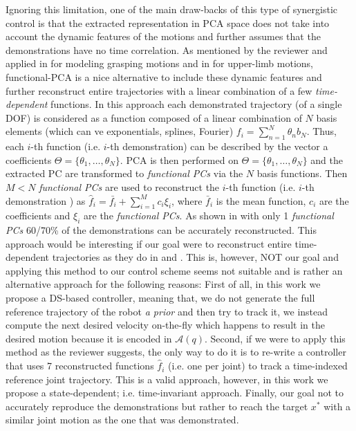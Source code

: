 \documentclass{article}
\begin{document}
\begin{enumerate}
Ignoring this limitation, one of the main draw-backs of this type of synergistic control is that the extracted representation in PCA space does not take into account the dynamic features of the motions and further assumes that the demonstrations have no time correlation. As mentioned by the reviewer and applied in \cite{Dai:IROS:2013} for modeling grasping motions and in \cite{Averta:FRAI:2017} for upper-limb motions, functional-PCA is a nice alternative to include these dynamic features and further reconstruct entire trajectories with a linear combination of a few \textit{time-dependent} functions. In this approach each demonstrated trajectory (of a single DOF) is considered as a function composed of a linear combination of $N$ basis elements (which can ve exponentials, splines, Fourier) $f_i = \sum\limits_{n=1}^{N}\theta_nb_N$. Thus, each $i$-th function (i.e. $i$-th demonstration) can be described by the vector a coefficients $\Theta = \{\theta_1,\dots,\theta_N\}$. PCA is then performed on $\Theta = \{\theta_1,\dots,\theta_N\}$ and the extracted PC are transformed to \textit{functional PCs} via the $N$ basis functions. Then $M<N$ \textit{functional PCs} are used to reconstruct the $i$-th function (i.e. $i$-th demonstration ) as $\hat{f}_i = \bar{f_i} + \sum\limits_{i=1}^{M}c_i\xi_i$, where $\bar{f}_i$ is the mean function, $c_i$ are the coefficients and $\xi_i$ are the \textit{functional PCs}. As shown in \cite{Averta:FRAI:2017} with only 1 \textit{functional PCs} 60/70\% of the demonstrations can be accurately reconstructed. This approach would be interesting if our goal were to reconstruct entire time-dependent trajectories as they do in  \cite{Dai:IROS:2013} and \cite{Averta:FRAI:2017}. This is, however, NOT our goal and applying this method to our control scheme seems not suitable and is rather an alternative approach for the following reasons: First of all, in this work we propose a DS-based controller, meaning that, we do not generate the full reference trajectory of the robot \textit{a prior} and then try to track it, we instead compute the next desired velocity on-the-fly which happens to result in the desired motion because it is encoded in $\mathcal{A}(q)$. Second, if we were to apply this method as the reviewer suggests, the only way to do it is to re-write a controller that uses 7 reconstructed functions $\hat{f}_i$ (i.e. one per joint) to track a time-indexed reference joint trajectory. This is a valid approach, however, in this work we propose a state-dependent; i.e. time-invariant approach. Finally, our goal not to accurately reproduce the demonstrations but rather to reach the target $x^*$ with a similar joint motion as the one that was demonstrated.


\end{enumerate}
\end{document}
